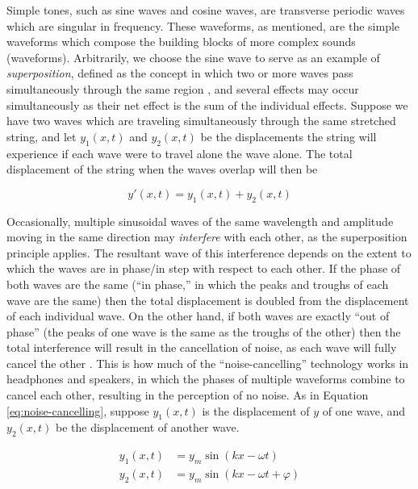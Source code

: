 Simple tones, such as sine waves and cosine waves, are transverse periodic waves which are singular in frequency. These waveforms, as mentioned, are the simple waveforms which compose the building blocks of more complex sounds (waveforms). Arbitrarily, we choose the sine wave to serve as an example of \textit{superposition}, defined as the concept in which two or more waves pass simultaneously through the same region \cite{Halliday_Resnick_Walker_2005}, and several effects may occur simultaneously as their net effect is the sum of the individual effects. Suppose we have two waves which are traveling simultaneously through the same stretched string, and let $y_1(x, t)$ and $y_2(x, t)$ be the displacements the string will experience if each wave were to travel alone the wave alone. The total displacement of the string when the waves overlap will then be

\begin{equation}
	y'(x, t) = y_1(x, t) + y_2(x, t)
\end{equation}

Occasionally, multiple sinusoidal waves of the same wavelength and amplitude moving in the same direction may \textit{interfere} with each other, as the superposition principle applies. The resultant wave of this interference depends on the extent to which the waves are in phase/in step with respect to each other. If the phase of both waves are the same (``in phase,'' in which the peaks and troughs of each wave are the same) then the total displacement is doubled from the displacement of each individual wave. On the other hand, if both waves are exactly ``out of phase'' (the peaks of one wave is the same as the troughs of the other) then the total interference will result in the cancellation of noise, as each wave will fully cancel the other \cite{Halliday_Resnick_Walker_2005}. This is how much of the ``noise-cancelling'' technology works in headphones and speakers, in which the phases of multiple waveforms combine to cancel each other, resulting in the perception of no noise. As in Equation \ref{eq:noise-cancelling}, suppose $y_1(x, t)$ is the displacement of $y$ of one wave, and $y_2(x, t)$ be the displacement of another wave. 

\begin{equation}
	\begin{aligned}
	y_1(x, t) &= y_m\sin(kx - \omega t) \\ 
	y_2(x, t) &= y_m\sin(kx - \omega t + \varphi)
	\label{eq:noise-cancelling}
	\end{aligned}
\end{equation}


